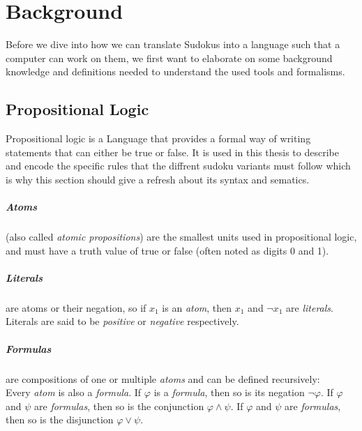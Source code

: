 
\chapter{Background}
Before we dive into how we can translate Sudokus into a language such that a computer can work on them, we first want to elaborate on some background knowledge and definitions needed to understand the used tools and formalisms.

\section{Propositional Logic}
Propositional logic is a Language that provides a formal way of writing statements that can either be true or false. It is used in this thesis to describe and encode the specific rules that the diffrent sudoku variants must follow which is why this section should give a refresh about its syntax and sematics.

\paragraph{Atoms}
(also called \emph{atomic propositions}) are the smallest units used in propositional logic, and must have a truth value of true or false (often noted as digits 0 and 1).

\paragraph{Literals}
are atoms or their negation, so if $x_1$ is an \emph{atom}, then $x_1$ and $\neg x_1$ are \emph{literals}. Literals are said to be \emph{positive} or \emph{negative} respectively.


\paragraph{Formulas} are compositions of one or multiple \emph{atoms} and can be defined recursively:\\
Every \emph{atom} is also a \emph{formula}.
If $\varphi$ is a \emph{formula}, then so is its negation $\neg\varphi$.
If $\varphi$ and $\psi$ are \emph{formulas}, then so is the conjunction $\varphi \land \psi$.
If $\varphi$ and $\psi$ are \emph{formulas}, then so is the disjunction $\varphi \lor \psi$.


